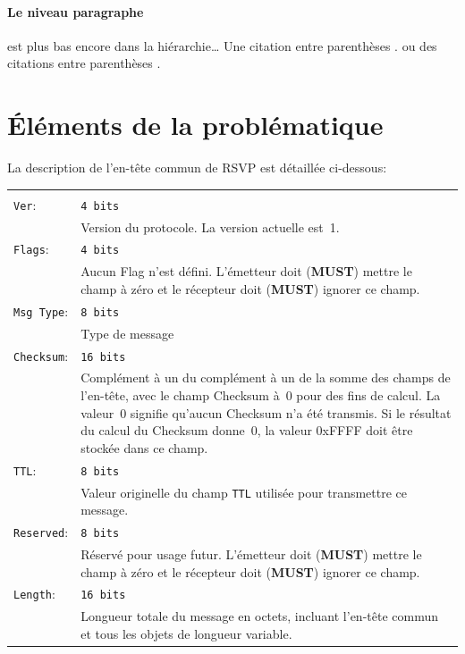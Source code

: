 \paragraph{Le niveau paragraphe} est plus bas encore dans la hiérarchie\ldots
Une citation entre parenthèses \cite{Chen2009}.
ou des citations entre parenthèses \cite{Haist2014,Senjian2015,Madani2010}.

\clearpage

\section{Éléments de la problématique}  %
La description de \mbox{l'en-tête} commun de RSVP est détaillée ci-dessous:\\
\begin{tabular}{p{1in}p{4.5in}}
&\\ %
\texttt{Ver}: & \texttt{4 bits}\\
          & Version du protocole. La version actuelle est~1.\\[5pt]
\texttt{Flags}: & \texttt{4 bits}\\
          & Aucun Flag n'est défini. L'émetteur doit (\textbf{MUST})
          mettre le champ à zéro et le récepteur doit (\textbf{MUST})
          ignorer ce champ.\\[5pt]
\texttt{Msg Type}: & \texttt{8 bits}\\
          & Type de message\\[5pt]
\texttt{Checksum}: & \texttt{16 bits}\\
          & Complément à un du complément à un de la somme des champs
          de \mbox{l'en-tête}, avec le champ Checksum à~0 pour des
          fins de calcul. La valeur~0 signifie qu'aucun Checksum n'a
          été transmis. Si le résultat du calcul du Checksum donne~0,
          la valeur 0xFFFF doit être stockée dans ce champ.\\[5pt]
\texttt{TTL}: & \texttt{8 bits}\\
          & Valeur originelle du champ \texttt{TTL} utilisée pour
          transmettre ce message.\\[5pt]
\texttt{Reserved}: & \texttt{8 bits}\\
          & Réservé pour usage futur. L'émetteur doit (\textbf{MUST})
          mettre le champ à zéro et le récepteur doit (\textbf{MUST})
          ignorer ce champ.\\[5pt]
\texttt{Length}: & \texttt{16 bits}\\
          & Longueur totale du message en octets, incluant
          \mbox{l'en-tête} commun et tous les objets de longueur
          variable.
\end{tabular}


